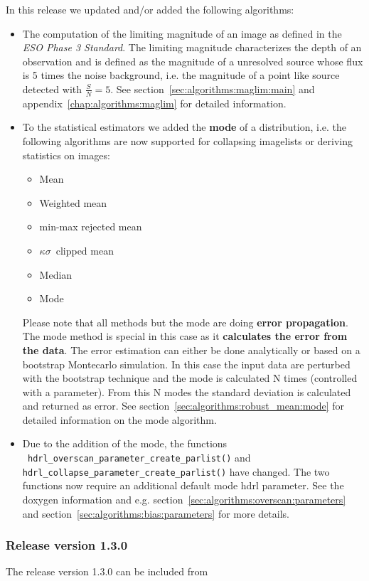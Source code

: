 In this release we updated and/or added the following algorithms:
\begin{itemize}
\item The computation of the limiting magnitude of an image as defined
  in the \textit{ESO Phase 3 Standard}. The limiting magnitude
  characterizes the depth of an observation and is defined as the
  magnitude of a unresolved source whose flux is 5 times the noise
  background, i.e. the magnitude of a point like source detected with
  $\frac{S}{N}=5$. See section~\ref{sec:algorithms:maglim:main} and
  appendix~\ref{chap:algorithms:maglim} for detailed information.
\item To the statistical estimators we added the \textbf{mode} of a
  distribution, i.e. the following algorithms are now supported for
  collapsing imagelists or deriving statistics on images:
  \begin{itemize}
  \item Mean
  \item Weighted mean
  \item min-max rejected mean
  \item $\kappa\sigma$~clipped mean
  \item Median
  \item Mode
  \end{itemize}
  Please note that all methods but the mode are doing \textbf{error
    propagation}. The mode method is special in this case as it
  \textbf{calculates the error from the data}. The error estimation
  can either be done analytically or based on a bootstrap Montecarlo
  simulation. In this case the input data are perturbed with the
  bootstrap technique and the mode is calculated N times (controlled
  with a parameter). From this N modes the standard deviation is
  calculated and returned as error. See
  section~\ref{sec:algorithms:robust_mean:mode} for detailed
  information on the mode algorithm.
\item Due to the addition of the mode, the
  functions\\ \verb+ hdrl_overscan_parameter_create_parlist()+
  and\\ \verb+hdrl_collapse_parameter_create_parlist()+ have
  changed. The two functions now require an additional default mode
  hdrl parameter. See the doxygen information and
  e.g. section~\ref{sec:algorithms:overscan:parameters} and
  section~\ref{sec:algorithms:bias:parameters} for more details.
\end{itemize}


\subsubsection{Release version 1.3.0}
The \HDRL release version 1.3.0 can be included from\\

